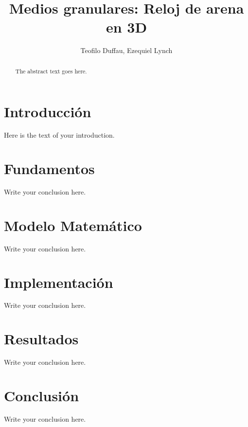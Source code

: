 \documentclass{article}
\begin{document}
\title{Medios granulares: Reloj de arena en 3D}
\author{Teofilo Duffau, Ezequiel Lynch}

\maketitle

\begin{abstract}
The abstract text goes here.
\end{abstract}

\section{Introducción}
Here is the text of your introduction.



\section{Fundamentos}
Write your conclusion here.

\section{Modelo Matemático}
Write your conclusion here.

\section{Implementación}
Write your conclusion here.

\section{Resultados}
Write your conclusion here.

\section{Conclusión}
Write your conclusion here.
\end{document}

